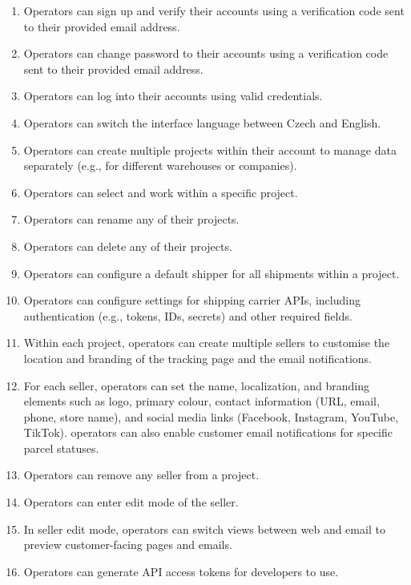 \begin{enumerate}[label=\bfseries FR\arabic*:,leftmargin=*]
    \item Operators can sign up and verify their accounts using a verification code sent to their provided email address.
    \item Operators can change password to their accounts using a verification code sent to their provided email address.
    \item Operators can log into their accounts using valid credentials.
    \item Operators can switch the interface language between Czech and English.
    \item Operators can create multiple \glspl{project} within their account to manage data separately (e.g., for different warehouses or companies).
    \item Operators can select and work within a specific \gls{project}.
    \item Operators can rename any of their \glspl{project}.
    \item Operators can delete any of their \glspl{project}.
    \item Operators can configure a default shipper for all shipments within a \gls{project}.
    \item Operators can configure settings for shipping carrier APIs, including authentication (e.g., tokens, IDs, secrets) and other required fields.
    \item Within each \gls{project}, operators can create multiple sellers to customise the location and branding of the tracking page and the email notifications.
    \item For each \gls{seller}, operators can set the name, localization, and branding elements such as logo, primary colour, contact information (URL, email, phone, store name), and social media links (Facebook, Instagram, YouTube, TikTok). operators can also enable customer email notifications for specific parcel statuses.
    \item Operators can remove any \gls{seller} from a \gls{project}.
    \item Operators can enter edit mode of the \gls{seller}.
    \item In \gls{seller} edit mode, operators can switch views between web and email to preview customer-facing pages and emails.
    \item Operators can generate API access tokens for developers to use.

\end{enumerate}
